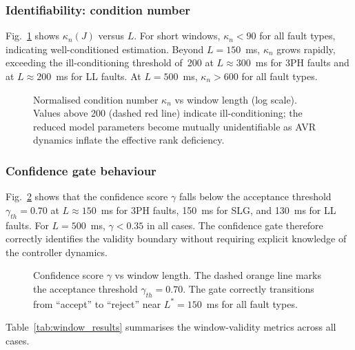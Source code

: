 \documentclass[journal,twoside,letterpaper]{IEEEtran}
\begin{document}
\subsubsection{Identifiability: condition number}

Fig.~\ref{fig:condition_number} shows $\kappa_n(J)$ versus $L$.
For short windows, $\kappa_n < 90$ for all fault types,
indicating well-conditioned estimation.
Beyond $L = 150$~ms, $\kappa_n$ grows rapidly, exceeding the
ill-conditioning threshold of~200 at $L \approx 300$~ms for
3PH faults and at $L \approx 200$~ms for LL faults.
At $L = 500$~ms, $\kappa_n > 600$ for all fault types.

\begin{figure}[!t]
  \centering
  
  \caption{Normalised condition number $\kappa_n$ vs window
    length (log scale).
    Values above 200 (dashed red line) indicate
    ill-conditioning; the reduced model parameters become
    mutually unidentifiable as AVR dynamics inflate the
    effective rank deficiency.}
  \label{fig:condition_number}
\end{figure}

\subsubsection{Confidence gate behaviour}

Fig.~\ref{fig:confidence_score} shows that the confidence
score $\gamma$ falls below the acceptance threshold
$\gamma_{th} = 0.70$ at $L \approx 150$~ms for 3PH faults,
150~ms for SLG, and 130~ms for LL faults.
For $L = 500$~ms, $\gamma < 0.35$ in all cases.
The confidence gate therefore correctly identifies the validity
boundary without requiring explicit knowledge of the controller
dynamics.

\begin{figure}[!t]
  \centering
  
  \caption{Confidence score $\gamma$ vs window length.
    The dashed orange line marks the acceptance threshold
    $\gamma_{th} = 0.70$.
    The gate correctly transitions from ``accept'' to
    ``reject'' near $L^\ast = 150$~ms for all fault types.}
  \label{fig:confidence_score}
\end{figure}

Table~\ref{tab:window_results} summarises the window-validity
metrics across all cases.
\end{document}
